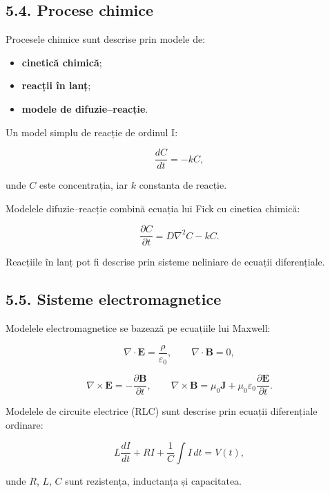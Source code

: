 \documentclass[12pt,a4paper]{article}
\begin{document}
\subsection{5.4. Procese chimice}

Procesele chimice sunt descrise prin modele de:

\begin{itemize}
    \item \textbf{cinetică chimică};
    \item \textbf{reacții în lanț};
    \item \textbf{modele de difuzie–reacție}.
\end{itemize}

Un model simplu de reacție de ordinul I:


\[
\frac{dC}{dt} = -k C,
\]


unde $C$ este concentrația, iar $k$ constanta de reacție.

Modelele difuzie–reacție combină ecuația lui Fick cu cinetica chimică:


\[
\frac{\partial C}{\partial t} = D \nabla^2 C - k C.
\]



Reacțiile în lanț pot fi descrise prin sisteme neliniare de ecuații diferențiale.

\subsection{5.5. Sisteme electromagnetice}

Modelele electromagnetice se bazează pe ecuațiile lui Maxwell:


\[
\nabla \cdot \mathbf{E} = \frac{\rho}{\varepsilon_0}, \qquad
\nabla \cdot \mathbf{B} = 0,
\]




\[
\nabla \times \mathbf{E} = -\frac{\partial \mathbf{B}}{\partial t}, \qquad
\nabla \times \mathbf{B} = \mu_0 \mathbf{J} + \mu_0 \varepsilon_0 \frac{\partial \mathbf{E}}{\partial t}.
\]



Modelele de circuite electrice (RLC) sunt descrise prin ecuații diferențiale ordinare:


\[
L \frac{dI}{dt} + RI + \frac{1}{C} \int I \, dt = V(t),
\]


unde $R$, $L$, $C$ sunt rezistența, inductanța și capacitatea.
\end{document}
